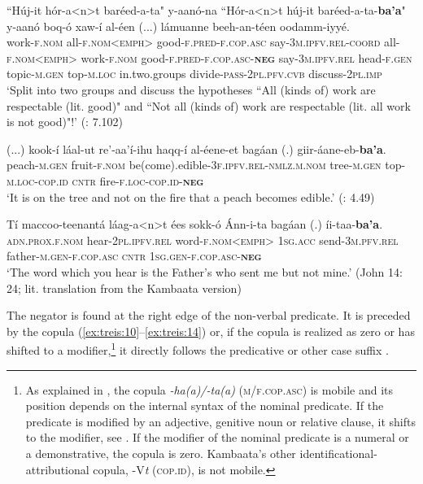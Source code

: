 \documentclass[output=paper,colorlinks,citecolor=brown,draftmode
]{langscibook}
\begin{document}
\ea\label{ex:treis:12} 
\gll “Húj-it hór-a<n>t baréed-a-ta" y-aanó-na “Hór-a<n>t húj-it baréed-a-ta-\textbf{ba'a}" y-aanó boq-ó xaw-í al-éen (...) lámuanne beeh-an-téen oodamm-iyyé.\\
{\db}work-\textsc{f.nom} all-\textsc{f.nom<emph>} good-\textsc{f.pred-f.cop.asc} say-\textsc{3m.ipfv.rel-coord} {\db}all-\textsc{f.nom<emph>} work-\textsc{f.nom} good-\textsc{f.pred-f.cop.asc-\textbf{neg}} say-\textsc{3m.ipfv.rel} head-\textsc{f.gen} topic-\textsc{m.gen} top-\textsc{m.loc} {} in.two.groups divide-\textsc{pass-2pl.pfv.cvb} discuss-\textsc{2pl.imp}\\
\glt ‘Split into two groups and discuss the hypotheses “All (kinds of) work are respectable (lit. good)" and “Not all (kinds of) work are respectable (lit. all work is not good)"!' (\citealt{KEB1989}{:} 7.102)
\z 

\ea\label{ex:treis:13} 
\gll (...) kook-í láal-ut re'-aa'í-ihu haqq-í al-éene-et bagáan (.) giir-áane-eb-\textbf{ba'a}.\\
{} peach-\textsc{m.gen} fruit-\textsc{f.nom} be(come).edible-\textsc{3f.ipfv.rel-nmlz.m.nom} tree-\textsc{m.gen} top-\textsc{m.loc-cop.id} \textsc{cntr} {} fire-\textsc{f.loc-cop.id-\textbf{neg}}\\
\glt ‘It is on the tree and not on the fire that a peach becomes edible.'\footnotemark{} (\cite{KEB1989}{:} 4.49)
\z 
{}

\ea\label{ex:treis:14} 
\gll Tí maccoo-teenantá láag-a<n>t ées sokk-ó Ánn-i-ta bagáan (.) íi-taa-\textbf{ba’a}.\\
\textsc{\textsc{adn}.prox.f.nom} hear-\textsc{2pl.ipfv.rel} word-\textsc{f.nom<emph>} \textsc{1sg.acc} send-\textsc{3m.pfv.rel} father-\textsc{m.gen-f.cop.asc} \textsc{cntr} {} \textsc{1sg.gen-f.cop.asc-\textbf{neg}}\\
\glt ‘The word which you hear is the Father’s who sent me but not mine.' (John 14: 24; lit. translation from the Kambaata version) \citep[]{BibleSociety2023}
\z 

The negator is found at the right edge of the non-verbal predicate. It is preceded by the copula (\ref{ex:treis:10}--\ref{ex:treis:14}) or,
if the copula is realized as zero or has shifted to a modifier,\footnote{As explained in \citet[414--420]{Treis2008}, the copula \textit{-ha(a)/-ta(a)} (\textsc{m/f.cop.asc}) is mobile and its position depends on the internal syntax of the nominal predicate. If the predicate is modified by an adjective, genitive noun or relative clause, it shifts to the modifier, see . If the modifier of the nominal predicate is a numeral or a demonstrative, the copula is zero. Kambaata's other identificational-attributional copula, -V\textit{t} (\textsc{cop.id}), is not mobile.} it directly follows the predicative or other case suffix .
\end{document}
